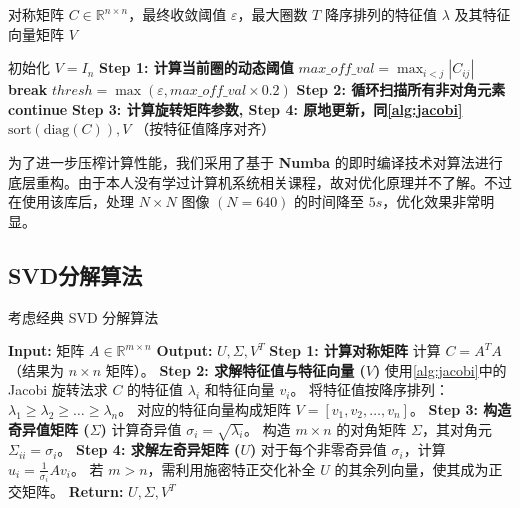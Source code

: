 	\begin{algorithm}[H]
		\caption{动态阈值Jacobi旋转法}
		\label{alg:optimized_jacobi}
		\begin{algorithmic}[1]
			\Require 对称矩阵 $C \in \mathbb{R}^{n \times n}$，最终收敛阈值 $\varepsilon$，最大圈数 $T$
			\Ensure 降序排列的特征值 $\lambda$ 及其特征向量矩阵 $V$
			
			\State 初始化 $V = I_n$
			\State \textbf{Step 1: 计算当前圈的动态阈值}
			\State $max\_off\_val = \max_{i < j} |C_{ij}|$
			\State \textbf{break} 
			\EndIf
			\State $thresh = \max(\varepsilon, max\_off\_val \times 0.2)$ 
			\State
			\State \textbf{Step 2: 循环扫描所有非对角元素}
			 \textbf{continue} 
			\EndIf
			\State \textbf{Step 3: 计算旋转矩阵参数, Step 4: 原地更新，同\ref{alg:jacobi}}
			\EndFor
			\EndFor
			\EndFor
			\State \Return $\text{sort}(\text{diag}(C)), V$ （按特征值降序对齐）
		\end{algorithmic}
	\end{algorithm}

	为了进一步压榨计算性能，我们采用了基于 \textbf{Numba} 的即时编译技术对算法进行底层重构。由于本人没有学过计算机系统相关课程，故对优化原理并不了解。不过在使用该库后，处理 $N \times N$ 图像 $(N = 640)$ 的时间降至 $5s$，优化效果非常明显。
	
	\subsection{SVD分解算法}
	
	考虑经典 SVD 分解算法

	\begin{algorithm}[H]
		\caption{SVD 分解算法}
		\label{alg:svd}
		\begin{algorithmic}[1]
			\State \textbf{Input:} 矩阵 $A \in \mathbb{R}^{m \times n}$
			\State \textbf{Output:} $U, \Sigma, V^T$
			\State
			\State \textbf{Step 1: 计算对称矩阵}
			\State 计算 $C = A^T A$ （结果为 $n \times n$ 矩阵）。
			\State
			\State \textbf{Step 2: 求解特征值与特征向量 ($V$)}
			\State 使用\ref{alg:jacobi}中的 Jacobi 旋转法求 $C$ 的特征值 $\lambda_i$ 和特征向量 $v_i$。
			\State 将特征值按降序排列：$\lambda_1 \ge \lambda_2 \ge \dots \ge \lambda_n$。
			\State 对应的特征向量构成矩阵 $V = [v_1, v_2, \dots, v_n]$。
			\State
			\State \textbf{Step 3: 构造奇异值矩阵 ($\Sigma$)}
			\State 计算奇异值 $\sigma_i = \sqrt{\lambda_i}$。
			\State 构造 $m \times n$ 的对角矩阵 $\Sigma$，其对角元 $\Sigma_{ii} = \sigma_i$。
			\State
			\State \textbf{Step 4: 求解左奇异矩阵 ($U$)}
			\State 对于每个非零奇异值 $\sigma_i$，计算 $u_i = \frac{1}{\sigma_i} A v_i$。
			\State 若 $m > n$，需利用施密特正交化补全 $U$ 的其余列向量，使其成为正交矩阵。
			\State
			\State \textbf{Return:} $U, \Sigma, V^T$
		\end{algorithmic}
	\end{algorithm}
	
